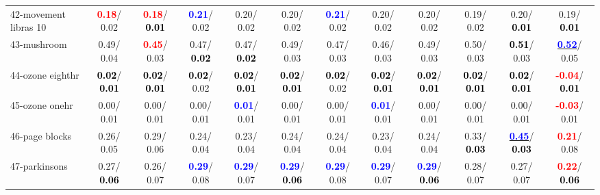 \begin{table}[h]
\begin{center}
{\begin{tabular}{lc|c|c|c|c|c|c|c|c|c|c}
42-movement libras 10 & \textcolor{red}{\textbf{  0.18}}/  0.02 & \textcolor{red}{\textbf{  0.18}}/\textcolor{black}{\textbf{  0.01}} & \textcolor{blue}{\textbf{  0.21}}/  0.02 &   0.20/  0.02 &   0.20/  0.02 & \textcolor{blue}{\textbf{  0.21}}/  0.02 &   0.20/  0.02 &   0.20/  0.02 &   0.19/  0.02 &   0.20/\textcolor{black}{\textbf{  0.01}} &   0.19/\textcolor{black}{\textbf{  0.01}} \\
43-mushroom &   0.49/  0.04 & \textcolor{red}{\textbf{  0.45}}/  0.03 &   0.47/\textcolor{black}{\textbf{  0.02}} &   0.47/\textcolor{black}{\textbf{  0.02}} &   0.49/  0.03 &   0.47/  0.03 &   0.46/  0.03 &   0.49/  0.03 &   0.50/  0.03 & \textcolor{black}{\textbf{  0.51}}/  0.03 & \underline{\textcolor{blue}{\textbf{  0.52}}}/  0.05 \\
44-ozone eighthr & \textcolor{black}{\textbf{  0.02}}/\textcolor{black}{\textbf{  0.01}} & \textcolor{black}{\textbf{  0.02}}/\textcolor{black}{\textbf{  0.01}} & \textcolor{black}{\textbf{  0.02}}/  0.02 & \textcolor{black}{\textbf{  0.02}}/\textcolor{black}{\textbf{  0.01}} & \textcolor{black}{\textbf{  0.02}}/\textcolor{black}{\textbf{  0.01}} & \textcolor{black}{\textbf{  0.02}}/  0.02 & \textcolor{black}{\textbf{  0.02}}/\textcolor{black}{\textbf{  0.01}} & \textcolor{black}{\textbf{  0.02}}/\textcolor{black}{\textbf{  0.01}} & \textcolor{black}{\textbf{  0.02}}/\textcolor{black}{\textbf{  0.01}} & \textcolor{black}{\textbf{  0.02}}/\textcolor{black}{\textbf{  0.01}} & \textcolor{red}{\textbf{ -0.04}}/\textcolor{black}{\textbf{  0.01}} \\
45-ozone onehr &   0.00/  0.01 &   0.00/  0.01 &   0.00/  0.01 & \textcolor{blue}{\textbf{  0.01}}/  0.01 &   0.00/  0.01 &   0.00/  0.01 & \textcolor{blue}{\textbf{  0.01}}/  0.01 &   0.00/  0.01 &   0.00/  0.01 &   0.00/  0.01 & \textcolor{red}{\textbf{ -0.03}}/  0.01 \\
46-page blocks &   0.26/  0.05 &   0.29/  0.06 &   0.24/  0.04 &   0.23/  0.04 &   0.24/  0.04 &   0.24/  0.04 &   0.23/  0.04 &   0.24/  0.04 &   0.33/\textcolor{black}{\textbf{  0.03}} & \underline{\textcolor{blue}{\textbf{  0.45}}}/\textcolor{black}{\textbf{  0.03}} & \textcolor{red}{\textbf{  0.21}}/  0.08 \\ \hline
47-parkinsons &   0.27/\textcolor{black}{\textbf{  0.06}} &   0.26/  0.07 & \textcolor{blue}{\textbf{  0.29}}/  0.08 & \textcolor{blue}{\textbf{  0.29}}/  0.07 & \textcolor{blue}{\textbf{  0.29}}/\textcolor{black}{\textbf{  0.06}} & \textcolor{blue}{\textbf{  0.29}}/  0.08 & \textcolor{blue}{\textbf{  0.29}}/  0.07 & \textcolor{blue}{\textbf{  0.29}}/\textcolor{black}{\textbf{  0.06}} &   0.28/  0.07 &   0.27/  0.07 & \textcolor{red}{\textbf{  0.22}}/\textcolor{black}{\textbf{  0.06}} \\

\end{tabular}}
\end{center}
\end{table}
